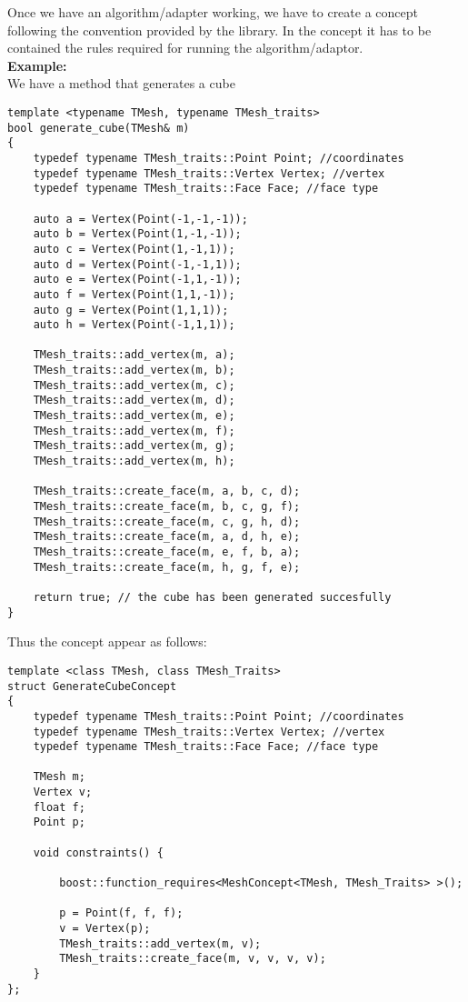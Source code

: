 \begin{appendices}
Once we have an algorithm/adapter working, we have to create a concept following the convention
provided by the library. In the concept it has to be contained the rules required for running the
algorithm/adaptor.\\

\textbf{Example:}\\
We have a method that generates a cube
\label{app:cube}
\begin{lstlisting}
template <typename TMesh, typename TMesh_traits>
bool generate_cube(TMesh& m)
{
	typedef typename TMesh_traits::Point Point; //coordinates
	typedef typename TMesh_traits::Vertex Vertex; //vertex
	typedef typename TMesh_traits::Face Face; //face type
	
	auto a = Vertex(Point(-1,-1,-1));
	auto b = Vertex(Point(1,-1,-1));
	auto c = Vertex(Point(1,-1,1));
	auto d = Vertex(Point(-1,-1,1));
	auto e = Vertex(Point(-1,1,-1));
	auto f = Vertex(Point(1,1,-1));
	auto g = Vertex(Point(1,1,1));
	auto h = Vertex(Point(-1,1,1));
	
	TMesh_traits::add_vertex(m, a);
	TMesh_traits::add_vertex(m, b);
	TMesh_traits::add_vertex(m, c);
	TMesh_traits::add_vertex(m, d);
	TMesh_traits::add_vertex(m, e);
	TMesh_traits::add_vertex(m, f);
	TMesh_traits::add_vertex(m, g);
	TMesh_traits::add_vertex(m, h);

	TMesh_traits::create_face(m, a, b, c, d);
	TMesh_traits::create_face(m, b, c, g, f);
	TMesh_traits::create_face(m, c, g, h, d);
	TMesh_traits::create_face(m, a, d, h, e);		
	TMesh_traits::create_face(m, e, f, b, a);		
	TMesh_traits::create_face(m, h, g, f, e);
	
	return true; // the cube has been generated succesfully
}
\end{lstlisting}
Thus the concept appear as follows:

\begin{lstlisting}
template <class TMesh, class TMesh_Traits>
struct GenerateCubeConcept
{
	typedef typename TMesh_traits::Point Point; //coordinates
	typedef typename TMesh_traits::Vertex Vertex; //vertex
	typedef typename TMesh_traits::Face Face; //face type

	TMesh m;
	Vertex v;
	float f;
	Point p;

	void constraints() {

		boost::function_requires<MeshConcept<TMesh, TMesh_Traits> >();

		p = Point(f, f, f);
		v = Vertex(p);
		TMesh_traits::add_vertex(m, v);
		TMesh_traits::create_face(m, v, v, v, v);
	}
};
\end{lstlisting}


\end{appendices}
